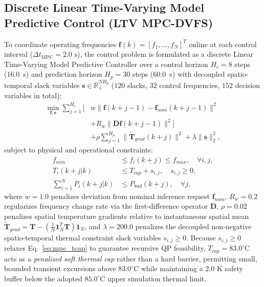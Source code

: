\documentclass[a4paper,fleqn]{cas-dc}
\begin{document}
\subsection{Discrete Linear Time-Varying Model Predictive Control (LTV MPC-DVFS)}
To coordinate operating frequencies $\mathbf{f}(k) = [f_1, \dots, f_N]^T$ online at each control interval ($\Delta t_{\text{MPC}} = 2.0\text{ s}$), the control problem is formulated as a discrete Linear Time-Varying Model Predictive Controller over a control horizon $H_c = 8$ steps (16.0~s) and prediction horizon $H_p = 30$ steps (60.0~s) with decoupled spatio-temporal slack variables $\mathbf{s} \in \mathbb{R}_+^{N H_p}$ ($120$ slacks, $32$ control frequencies, $152$ decision variables in total):
\begin{align}
\min_{\mathbf{f}, \mathbf{s}} \sum_{j=1}^{H_c} \Big[ &w \|\mathbf{f}(k+j-1) - \mathbf{f}_{nom}(k+j-1)\|^2 \nonumber \\
&+ R_w \|\mathbf{D} \mathbf{f}(k+j-1)\|^2 \Big] \nonumber \\
&+ \rho \sum_{j=1}^{H_p} \|\tilde{\mathbf{T}}_{grad}(k+j)\|^2 + \lambda \|\mathbf{s}\|_2^2,
\label{eq:mpc_cost}
\end{align}
\noindent subject to physical and operational constraints:
\begin{align}
f_{min} &\le f_i(k+j) \le f_{max}, \quad \forall i, j, \label{eq:mpc_f} \\
T_i(k+j|k) &\le T_{cap} + s_{i,j}, \quad s_{i,j} \ge 0, \label{eq:mpc_tcap} \\
\sum_{i=1}^N P_i(k+j|k) &\le P_{bud}(k+j), \quad \forall j, \label{eq:mpc_pbud}
\end{align}
where $w = 1.0$ penalizes deviation from nominal inference request $\mathbf{f}_{nom}$, $R_w = 0.2$ regularizes frequency change rate via the first-difference operator $\mathbf{D}$, $\rho = 0.02$ penalizes spatial temperature gradients relative to instantaneous spatial mean $\tilde{\mathbf{T}}_{grad} = \mathbf{T} - (\frac{1}{N}\mathbf{1}_N^T\mathbf{T})\mathbf{1}_N$, and $\lambda = 200.0$ penalizes the decoupled non-negative spatio-temporal thermal constraint slack variables $s_{i,j} \ge 0$. Because $s_{i,j} \ge 0$ relaxes Eq.~\eqref{eq:mpc_tcap} to guarantee recursive QP feasibility, $T_{cap} = 83.0^\circ\text{C}$ acts as a \textit{penalized soft thermal cap} rather than a hard barrier, permitting small, bounded transient excursions above $83.0^\circ\text{C}$ while maintaining a $2.0\text{ K}$ safety buffer below the adopted $85.0^\circ\text{C}$ upper simulation thermal limit.
\end{document}
